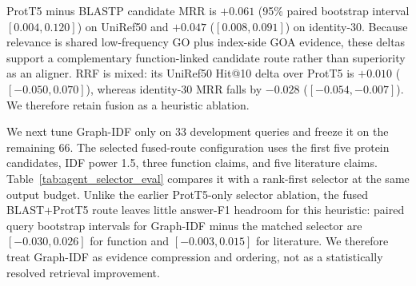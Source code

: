 \documentclass[11pt]{article}
\begin{document}
\begin{table}[t]
\centering
\caption{Cluster-held-out SeqLit-DAG retrieval and evidence paths on 100 queries per split. Identity-30 is a deliberately cluster-stratified stress test. Strict path requires an explicit retrieved candidate--GO--expected-PMID edge within 20 papers.}
\label{tab:cluster_seq_lit}
\end{table}

ProtT5 minus BLASTP candidate MRR is $+0.061$ (95\% paired bootstrap interval $[0.004,0.120]$) on UniRef50 and $+0.047$ ($[0.008,0.091]$) on identity-30. Because relevance is shared low-frequency GO plus index-side GOA evidence, these deltas support a complementary function-linked candidate route rather than superiority as an aligner. RRF is mixed: its UniRef50 Hit@10 delta over ProtT5 is $+0.010$ ($[-0.050,0.070]$), whereas identity-30 MRR falls by $-0.028$ ($[-0.054,-0.007]$). We therefore retain fusion as a heuristic ablation.

We next tune Graph-IDF only on 33 development queries and freeze it on the remaining 66. The selected fused-route configuration uses the first five protein candidates, IDF power 1.5, three function claims, and five literature claims. Table~\ref{tab:agent_selector_eval} compares it with a rank-first selector at the same output budget. Unlike the earlier ProtT5-only selector ablation, the fused BLAST+ProtT5 route leaves little answer-F1 headroom for this heuristic: paired query bootstrap intervals for Graph-IDF minus the matched selector are $[-0.030,0.026]$ for function and $[-0.003,0.015]$ for literature. We therefore treat Graph-IDF as evidence compression and ordering, not as a statistically resolved retrieval improvement.
\end{document}
